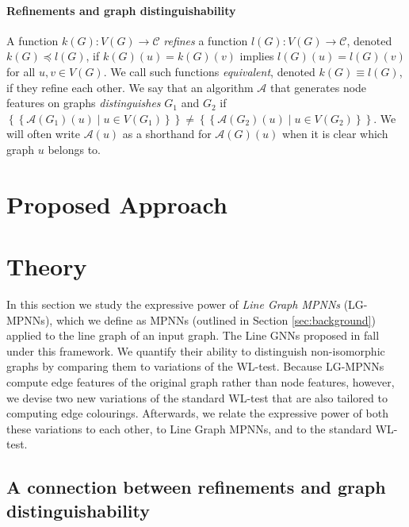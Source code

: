 \documentclass{article}
\newcommand{\multiset}[1]{\left\{\!\!\left\{#1\right\}\!\!\right\}}
\newcommand{\mca}{\mathcal{A}}
\newcommand{\mcc}{\mathcal{C}}
\begin{document}
\paragraph{Refinements and graph distinguishability}
A function $k(G): V(G) \rightarrow \mcc$ \emph{refines} a function $l(G): V(G) \rightarrow \mcc$, denoted $k(G) \preceq l(G)$, if $k(G)(u) = k(G)(v)$ implies $l(G)(u) = l(G)(v)$ for all $u,v\in V(G)$. We call such functions \emph{equivalent}, denoted $k(G) \equiv l(G)$, if they refine each other.
We say that an algorithm $\mca$ that generates node features on graphs \emph{distinguishes} $G_1$ and $G_2$ if $\multiset{\mca(G_1)(u) \mid u\in V(G_1)} \neq \multiset{\mca(G_2)(u) \mid u\in V(G_2)}$. We will often write $\mca(u)$ as a shorthand for $\mca(G)(u)$ when it is clear which graph $u$ belongs to.





\section{Proposed Approach}




\section{Theory}


In this section we study the expressive power of \emph{Line Graph MPNNs} (LG-MPNNs), which we define as MPNNs (outlined in Section \ref{sec:background}) applied to the line graph of an input graph.
The Line GNNs proposed in \cite{cai2021line} fall under this framework.
We quantify their ability to distinguish non-isomorphic graphs by comparing them to variations of the WL-test.
Because LG-MPNNs compute edge features of the original graph rather than node features, however, we devise two new variations of the standard WL-test that are also tailored to computing edge colourings. 
Afterwards, we relate the expressive power of both these variations to each other, to Line Graph MPNNs, and to the standard WL-test.


\subsection{A connection between refinements and graph distinguishability}
\end{document}

